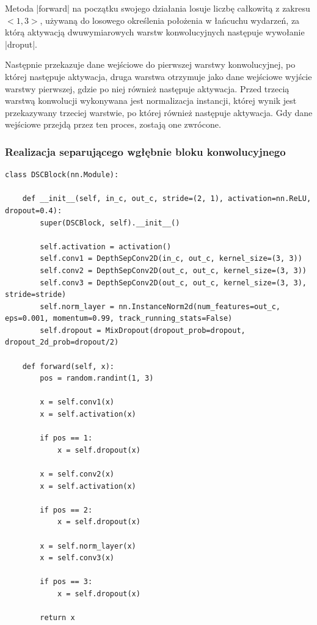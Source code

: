 Metoda \pyth|forward| na początku swojego działania losuje liczbę całkowitą z zakresu $<1, 3>$, używaną do losowego określenia położenia w łańcuchu wydarzeń, za którą aktywacją dwuwymiarowych warstw konwolucyjnych następuje wywołanie \pyth|droput|.

Następnie przekazuje dane wejściowe do pierwszej warstwy konwolucyjnej, po której następuje aktywacja, druga warstwa otrzymuje jako dane wejściowe wyjście warstwy pierwszej, gdzie po niej również następuje aktywacja. Przed trzecią warstwą konwolucji wykonywana jest normalizacja instancji, której wynik jest przekazywany trzeciej warstwie, po której również następuje aktywacja. Gdy dane wejściowe przejdą przez ten proces, zostają one zwrócone. 


\subsubsection{Realizacja separującego wgłębnie bloku konwolucyjnego} \label{DSCBlock}
\begin{lstlisting}[caption={\pyth|DSCBlock| - klasa głębokiego separującego bloku konwolucyjnego}, label={dscblock}]
class DSCBlock(nn.Module):

	def __init__(self, in_c, out_c, stride=(2, 1), activation=nn.ReLU, dropout=0.4):
		super(DSCBlock, self).__init__()
		
		self.activation = activation()
		self.conv1 = DepthSepConv2D(in_c, out_c, kernel_size=(3, 3))
		self.conv2 = DepthSepConv2D(out_c, out_c, kernel_size=(3, 3))
		self.conv3 = DepthSepConv2D(out_c, out_c, kernel_size=(3, 3), stride=stride)
		self.norm_layer = nn.InstanceNorm2d(num_features=out_c, eps=0.001, momentum=0.99, track_running_stats=False)
		self.dropout = MixDropout(dropout_prob=dropout, dropout_2d_prob=dropout/2)
	
	def forward(self, x):
		pos = random.randint(1, 3)
		
		x = self.conv1(x)
		x = self.activation(x)
		
		if pos == 1:
			x = self.dropout(x)
		
		x = self.conv2(x)
		x = self.activation(x)
		
		if pos == 2:
			x = self.dropout(x)
		
		x = self.norm_layer(x)
		x = self.conv3(x)
		
		if pos == 3:
			x = self.dropout(x)
		
		return x
\end{lstlisting}

